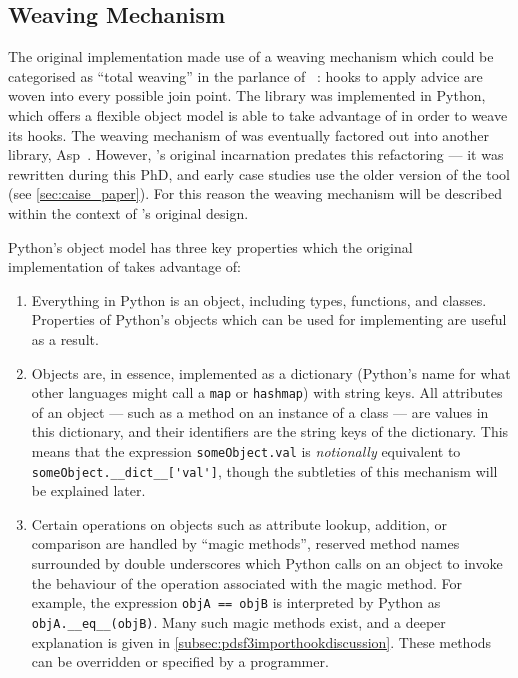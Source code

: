 \subsection{Weaving Mechanism}\label{subsec:prior_work_weaving} The original
\pdsf implementation made use of a weaving mechanism which could be categorised
as ``total weaving'' in the parlance of
\citeauthor{dynamicAOchitchyan}~\cite{dynamicAOchitchyan}: hooks to apply advice
are woven into every possible join point. The library was implemented in Python,
which offers a flexible object model \pdsf is able to take advantage of in order
to weave its hooks. The weaving mechanism of \pdsf was eventually factored out
into another library, Asp~\cite{asp_repo}. However, \pdsf{}'s original
incarnation predates this refactoring --- it was rewritten during this PhD, and
early case studies use the older version of the tool (see
\cref{sec:caise_paper}). For this reason the weaving mechanism will be described
within the context of \pdsf{}'s original design. 

Python's object model has three key properties which the original implementation
of \pdsf takes advantage of:

\label{first_reference_to_magic_methods}

\begin{enumerate}
    \item Everything in Python is an object, including types, functions, and
    classes. Properties of Python's objects which can be used for implementing
    \aop{} are useful as a result.
    \item Objects are, in essence, implemented as a dictionary (Python's
    name for what other languages might call a \lstinline{map} or
    \lstinline{hashmap}) with string keys. All attributes of an object --- such
    as a method on an instance of a class --- are values in this dictionary, and
    their identifiers are the string keys of the dictionary. This means that the
    expression \lstinline{someObject.val} is \emph{notionally} equivalent to
    \lstinline{someObject.__dict__['val']}, though the subtleties of this
    mechanism will be explained later.
    \item Certain operations on objects such as attribute lookup, addition, or
    comparison are handled by ``magic methods'', reserved method names
    surrounded by double underscores which Python calls on an object to invoke
    the behaviour of the operation associated with the magic method. For
    example, the expression \lstinline{objA == objB} is interpreted by Python as
    \lstinline{objA.__eq__(objB)}. Many such magic methods exist, and a deeper
    explanation is given in \cref{subsec:pdsf3importhookdiscussion}. These
    methods can be overridden or specified by a programmer.
\end{enumerate}

